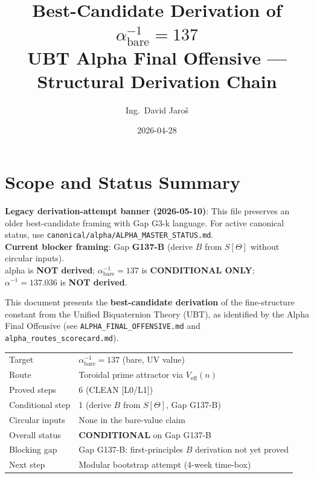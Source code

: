 \documentclass[12pt,a4paper]{article}
\title{\textbf{Best-Candidate Derivation of $\alpha^{-1}_{\mathrm{bare}} = 137$}\\
         \large UBT Alpha Final Offensive — Structural Derivation Chain}
\author{Ing.\ David Jaro\v{s}}
\date{2026-04-28}
\theoremstyle{definition}
\theoremstyle{remark}
\begin{document}
  \maketitle
\fi

\section{Scope and Status Summary}
\label{sec:bc:scope}

\begin{warnbox}
\textbf{Legacy derivation-attempt banner (2026-05-10)}:
This file preserves an older best-candidate framing with Gap G3-k language.
For active canonical status, use \texttt{canonical/alpha/ALPHA\_MASTER\_STATUS.md}.\\
\textbf{Current blocker framing}: Gap \textbf{G137-B} (derive $B$ from $S[\Theta]$
without circular inputs).\\
alpha is \textbf{NOT derived}; $\alpha^{-1}_{\mathrm{bare}}=137$ is
\textbf{CONDITIONAL ONLY}; $\alpha^{-1}=137.036$ is \textbf{NOT derived}.
\end{warnbox}

This document presents the \textbf{best-candidate derivation} of the
fine-structure constant from the Unified Biquaternion Theory (UBT), as
identified by the Alpha Final Offensive (see \texttt{ALPHA\_FINAL\_OFFENSIVE.md}
and \texttt{alpha\_routes\_scorecard.md}).

\begin{tcolorbox}[colback=blue!4!white, colframe=blue!50!black,
                  title=Best-Candidate Route: Prime Attractor on $S^1_\psi$]
\begin{tabular}{ll}
Target & $\alpha^{-1}_{\mathrm{bare}} = 137$ (bare, UV value) \\
Route & Toroidal prime attractor via $V_{\mathrm{eff}}(n)$ \\
Proved steps & 6 (CLEAN [L0/L1]) \\
Conditional step & 1 (derive $B$ from $S[\Theta]$, Gap G137-B) \\
Circular inputs & None in the bare-value claim \\
Overall status & \textbf{CONDITIONAL} on Gap G137-B \\
Blocking gap & Gap G137-B: first-principles $B$ derivation not yet proved \\
Next step & Modular bootstrap attempt (4-week time-box) \\
\end{tabular}
\end{tcolorbox}
\end{document}
